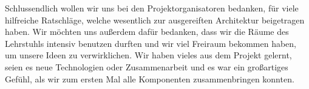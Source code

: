 Schlussendlich wollen wir uns bei den Projektorganisatoren bedanken, für viele
hilfreiche Ratschläge, welche wesentlich zur ausgereiften Architektur
beigetragen haben. Wir möchten uns außerdem dafür bedanken, dass wir die
Räume des Lehrstuhls intensiv benutzen durften und wir viel Freiraum bekommen
haben, um unsere Ideen zu verwirklichen. Wir haben vieles aus dem Projekt 
gelernt, seien es neue Technologien oder Zusammenarbeit und es war ein
großartiges Gefühl, als wir zum ersten Mal alle Komponenten zusammenbringen
konnten.
